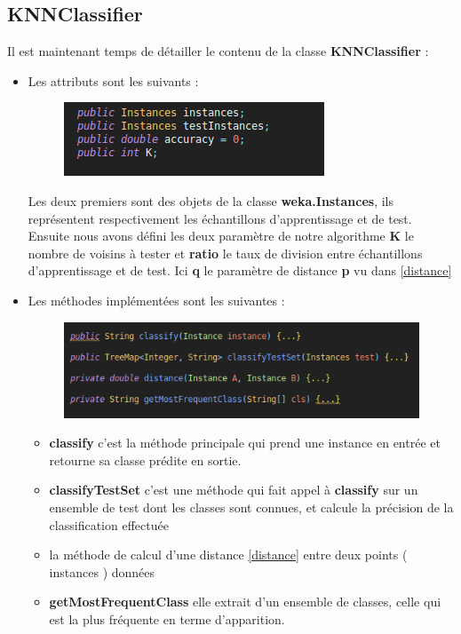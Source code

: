 		\subsection{KNNClassifier} 
		Il est maintenant temps de détailler le contenu de la classe \textbf{KNNClassifier} : 
		\begin{itemize}
			\item Les attributs sont les suivants : 
			\begin{figure}[H]
				\centering
				\includegraphics[width=0.75\linewidth]{knn/images/props.png}
			\end{figure}
			\par 
			Les deux premiers sont des objets de la classe \textbf{weka.Instances}, ils représentent respectivement les échantillons d'apprentissage et de test. Ensuite nous avons défini les deux paramètre de notre algorithme \textbf{K} le nombre de voisins à tester et \textbf{ratio} le taux de division entre échantillons d'apprentissage et de test. Ici \textbf{q} le paramètre de distance \textbf{p} vu dans \ref{distance}
			
			
			\item Les méthodes implémentées sont les suivantes : 
				\begin{figure}[H]
				\centering
				\includegraphics[width=0.75\linewidth]{knn/images/meths.png}
			\end{figure}
			\begin{itemize}
				\item \textbf{classify} c'est la méthode principale qui prend une instance en entrée et retourne sa classe prédite en sortie.
				\item \textbf{classifyTestSet} c'est une méthode qui fait appel à \textbf{classify} sur un ensemble de test dont les classes sont connues, et calcule la précision de la classification effectuée
				\item la méthode de calcul d'une distance \ref{distance} entre deux points ( instances ) données
				\item \textbf{getMostFrequentClass} elle extrait d'un ensemble de classes, celle qui est la plus fréquente en terme d'apparition.
			\end{itemize}
		\end{itemize}
